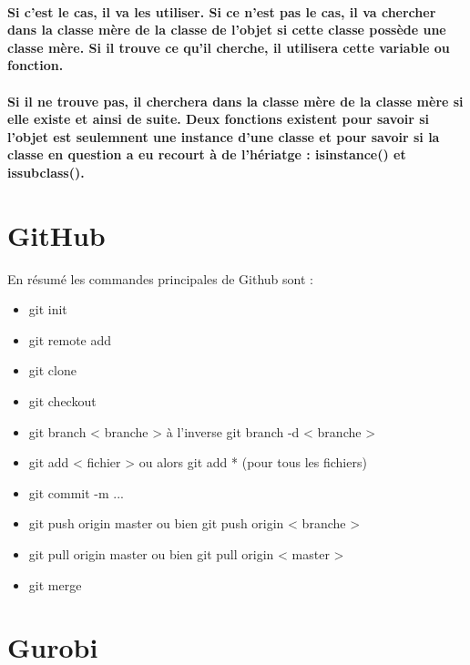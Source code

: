 \documentclass[a4paper, 12pt, twoside]{article}
\begin{document}
\paragraph{ Si c’est le cas, il va les utiliser. Si ce n’est pas le cas, il va chercher dans la classe mère de la classe de l’objet si cette classe possède une classe mère. Si il trouve ce qu’il cherche, il utilisera cette variable ou fonction.}
\paragraph{Si il ne trouve pas, il cherchera dans la classe mère de la classe mère si elle existe et ainsi de suite. Deux fonctions existent pour savoir si l'objet est seulemnent  une instance d'une classe et pour savoir si la classe en question a eu recourt à de l'hériatge : isinstance() et issubclass(). }
\section{GitHub}
En résumé les commandes principales de Github sont : 
\begin{itemize}
\item  git init 
\item git remote add 
\item  git clone 
\item  git checkout 
\item git branch < branche > à l'inverse  git branch -d < branche > 
\item git add < fichier > ou alors  git add * (pour tous les fichiers) 
\item  git commit -m ... 
\item  git push origin master ou bien  git push origin < branche > 
\item  git pull origin master   ou bien git pull origin < master > 
\item  git merge 
\end{itemize}
\section{Gurobi}
\end{document}
